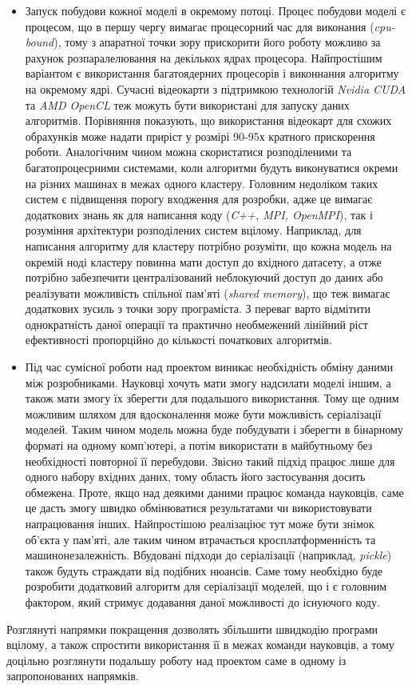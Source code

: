 \begin{itemize}
	\item Запуск побудови кожної моделі в окремому потоці. Процес побудови моделі є процесом, що в першу чергу вимагає процесорний час для виконання (\textit{cpu-bound}), тому з апаратної точки зору прискорити його роботу можливо за рахунок розпаралелювання на декількох ядрах процесора. Найпростішим варіантом є використання багатоядерних процесорів і виконнання алгоритму на окремому ядрі. Сучасні відеокарти з підтримкою технологій \textit{Nvidia CUDA} та \textit{AMD OpenCL} теж можуть бути використані для запуску даних алгоритмів. Порівняння показують, що використання відеокарт для схожих обрахунків може надати приріст у розмірі 90-95х кратного прискорення роботи. Аналогічним чином можна скористатися розподіленими та багатопроцесрними системами, коли алгоритми будуть виконуватися окреми на різних машинах в межах одного кластеру. Головним недоліком таких систем є підвищення порогу входження для розробки, адже це вимагає додаткових знань як для написання коду (\textit{C++, MPI, OpenMPI}), так і розуміння архітектури розподілених систем вцілому. Наприклад, для написання алгоритму для кластеру потрібно розуміти, що кожна модель на окремій ноді кластеру повинна мати доступ до вхідного датасету, а отже потрібно забезпечити централізований неблокуючий доступ до даних або реалізувати можливість спільної пам'яті (\textit{shared memory}), що теж вимагає додаткових зусиль з точки зору програміста. З переваг варто відмітити однократність даної операції та практично необмежений лінійний ріст ефективності пропорційно до кількості початкових алгоритмів.
	\item Під час сумісної роботи над проектом виникає необхідність обміну даними між розробниками. Науковці хочуть мати змогу надсилати моделі іншим, а також мати змогу їх зберегти для подальшого використання. Тому ще одним можливим шляхом для вдосконалення може бути можливість серіалізації моделей. Таким чином модель можна буде побудувати і зберегти в бінарному форматі на одному комп'ютері, а потім використати в майбутньому без необхідності повторної її перебудови. Звісно такий підхід працює лише для одного набору вхідних даних, тому область його застосування досить обмежена. Проте, якщо над деякими даними працює команда науковців, саме це дасть змогу швидко обмінюватися результатами чи використовувати напрацювання інших. Найпростішою реалізаціює тут може бути знімок об'єкта у пам'яті, але таким чином втрачається кросплатформенність та машинонезалежність. Вбудовані підходи до серіалізації (наприклад, \textit{pickle}) також будуть страждати від подібних нюансів. Саме тому необхідно буде розробити додатковий алгоритм для серіалізації моделей, що і є головним фактором, який стримує додавання даної можливості до існуючого коду.
\end{itemize}

Розглянуті напрямки покращення дозволять збільшити швидкодію програми вцілому, а також спростити використання її в межах команди науковців, а тому доцільно розглянути подальшу роботу над проектом саме в одному із запропонованих напрямків.